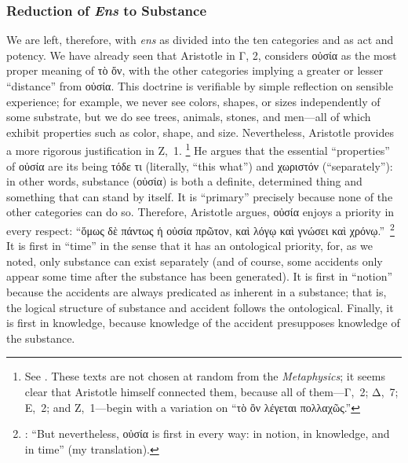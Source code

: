 \subsubsection{Reduction of \emph{Ens} to Substance}

We are left, therefore, with \emph{ens} as divided into the ten categories and as act and potency. We have already seen that Aristotle in Γ, 2, considers οὐσία as the most proper meaning of τὸ ὄν, with the other categories implying a greater or lesser “distance” from οὐσία. This doctrine is verifiable by simple reflection on sensible experience; for example, we never see colors, shapes, or sizes independently of some substrate, but we do see trees, animals, stones, and men—all of which exhibit properties such as color, shape, and size. Nevertheless, Aristotle provides a more rigorous justification in Ζ,~1.%
%
\footnote{See \cite[Ζ,~1, 1028a10–1028b8]{aristotle:metaphysics}. These texts are not chosen at random from the \emph{Metaphysics}; it seems clear that Aristotle himself connected them, because all of them—Γ,~2; Δ,~7; Ε,~2; and Ζ,~1—begin with a variation on “τὸ ὂν λέγεται πολλαχῶς.”} He argues that the essential “properties” of οὐσία are its being τόδε τι (literally, “this what”) and χωριστόν (“separately”): in other words, substance (οὐσία) is both a definite, determined thing and something that can stand by itself. It is “primary” precisely because none of the other categories can do so. Therefore, Aristotle argues, οὐσία enjoys a priority in every respect: “ὅμως δὲ πάντως ἡ οὐσία πρῶτον, καὶ λόγῳ καὶ γνώσει καὶ χρόνῳ.”\,%
%
\footnote{\Cite[Ζ,~1, 1028a33]{aristotle:metaphysics}: “But nevertheless, οὐσία is first in every way: in notion, in knowledge, and in time” (my translation).} It is first in “time” in the sense that it has an ontological priority, for, as we noted, only substance can exist separately (and of course, some accidents only appear some time after the substance has been generated). It is first in “notion” because the accidents are always predicated as inherent in a substance; that is, the logical structure of substance and accident follows the ontological. Finally, it is first in knowledge, because knowledge of the accident presupposes knowledge of the substance.%
%
